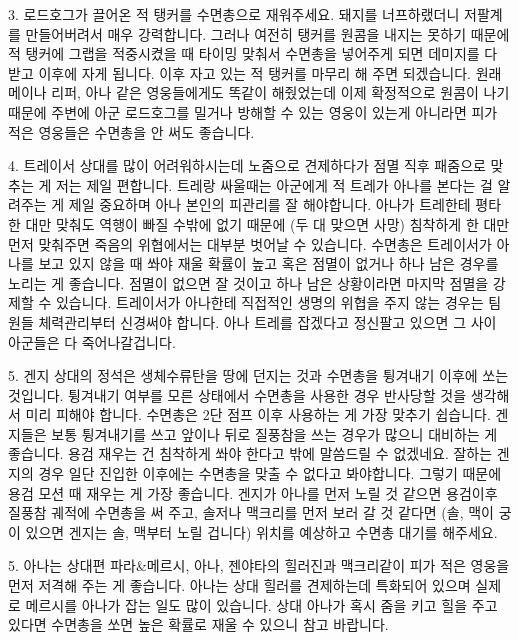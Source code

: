  



3. 로드호그가 끌어온 적 탱커를 수면총으로 재워주세요. 돼지를 너프하랬더니 저팔계를 만들어버려서 매우 강력합니다. 그러나 여전히 탱커를 원콤을 내지는 못하기 때문에 적 탱커에 그랩을 적중시켰을 때 타이밍 맞춰서 수면총을 넣어주게 되면 데미지를 다 받고 이후에 자게 됩니다. 이후 자고 있는 적 탱커를 마무리 해 주면 되겠습니다. 원래 메이나 리퍼, 아나 같은 영웅들에게도 똑같이 해줬었는데 이제 확정적으로 원콤이 나기 때문에 주변에 아군 로드호그를 밀거나 방해할 수 있는 영웅이 있는게 아니라면 피가 적은 영웅들은 수면총을 안 써도 좋습니다.

 



4. 트레이서 상대를 많이 어려워하시는데 노줌으로 견제하다가 점멸 직후 패줌으로 맞추는 게 저는 제일 편합니다. 트레랑 싸울때는 아군에게 적 트레가 아나를 본다는 걸 알려주는 게 제일 중요하며 아나 본인의 피관리를 잘 해야합니다. 아나가 트레한테 평타 한 대만 맞춰도 역행이 빠질 수밖에 없기 때문에 (두 대 맞으면 사망) 침착하게 한 대만 먼저 맞춰주면 죽음의 위협에서는 대부분 벗어날 수 있습니다. 수면총은 트레이서가 아나를 보고 있지 않을 때 쏴야 재울 확률이 높고 혹은 점멸이 없거나 하나 남은 경우를 노리는 게 좋습니다. 점멸이 없으면 잘 것이고 하나 남은 상황이라면 마지막 점멸을 강제할 수 있습니다. 트레이서가 아나한테 직접적인 생명의 위협을 주지 않는 경우는 팀원들 체력관리부터 신경써야 합니다. 아나 트레를 잡겠다고 정신팔고 있으면 그 사이 아군들은 다 죽어나갈겁니다.

 



5. 겐지 상대의 정석은 생체수류탄을 땅에 던지는 것과 수면총을 튕겨내기 이후에 쏘는 것입니다. 튕겨내기 여부를 모른 상태에서 수면총을 사용한 경우 반사당할 것을 생각해서 미리 피해야 합니다. 수면총은 2단 점프 이후 사용하는 게 가장 맞추기 쉽습니다. 겐지들은 보통 튕겨내기를 쓰고 앞이나 뒤로 질풍참을 쓰는 경우가 많으니 대비하는 게 좋습니다. 용검 재우는 건 침착하게 쏴야 한다고 밖에 말씀드릴 수 없겠네요. 잘하는 겐지의 경우 일단 진입한 이후에는 수면총을 맞출 수 없다고 봐야합니다. 그렇기 때문에 용검 모션 때 재우는 게 가장 좋습니다. 겐지가 아나를 먼저 노릴 것 같으면 용검이후 질풍참 궤적에 수면총을 써 주고, 솔저나 맥크리를 먼저 보러 갈 것 같다면 (솔, 맥이 궁이 있으면 겐지는 솔, 맥부터 노릴 겁니다) 위치를 예상하고 수면총 대기를 해주세요.

 



5. 아나는 상대편 파라&메르시, 아나, 젠야타의 힐러진과 맥크리같이 피가 적은 영웅을 먼저 저격해 주는 게 좋습니다. 아나는 상대 힐러를 견제하는데 특화되어 있으며 실제로 메르시를 아나가 잡는 일도 많이 있습니다. 상대 아나가 혹시 줌을 키고 힐을 주고 있다면 수면총을 쏘면 높은 확률로 재울 수 있으니 참고 바랍니다.

